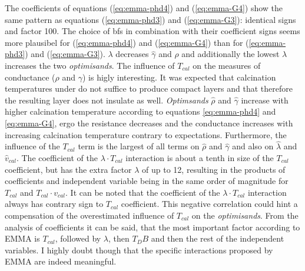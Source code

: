 The coefficients of equations (\ref{eq:emma-phd4}) and (\ref{eq:emma-G4}) show the same pattern 
as equations (\ref{eq:emma-phd3}) and (\ref{eq:emma-G3}): identical signs and factor 100. 
The choice of \gls{bf}s in combination with their coefficient signs seems more plausibel
for (\ref{eq:emma-phd4}) and (\ref{eq:emma-G4}) than for (\ref{eq:emma-phd3}) and (\ref{eq:emma-G3}). 
$\lambda$ decreases $\hat{\gamma}$ and $\hat{\rho}$ and additionally the lowest $\lambda$ increases the two \textit{optimisands}. 
The influence of $T_{cal}$ on the measures of conductance ($\rho$ and $\gamma$) is higly interesting. 
It was expected that 
calcination temperatures under  do not suffice to produce compact layers and 
that therefore the resulting layer does not insulate as well. 
\textit{Optimsands} $\hat\rho$ and $\hat{\gamma}$ increase with higher calcination temperature 
according to equations \ref{eq:emma-phd4} and \ref{eq:emma-G4}, 
ergo the resistance decreases and the conductance increases with increasing calcination temperature contrary to expectations.
Furthermore, the influence of the $T_{cal}$ term is the largest of all terms on $\hat{\rho}$ and $\hat{\gamma}$ and also on $\hat\lambda$ and $\hat{v}_{cal}$.
The coefficient of the $\lambda\cdot T_{cal}$ interaction is about a tenth in size of the $T_{cal}$ coefficient, 
but has the extra factor $\lambda$ of up to 12, resulting in the products of coefficients and independent variable being in the same order of magnitude for $T_{cal}$ and $T_{cal}\cdot v_{cal}$.
It can be noted that the coefficient of the $\lambda\cdot T_{cal}$ interaction always has contrary sign to $T_{cal}$ coefficient. 
This negative correlation could hint a compensation of the overestimated influence of $T_{cal}$ on the \textit{optimisands}.
%
From the analysis of coefficients it can be said, that the most important factor according to EMMA is $T_{cal}$, followed by $\lambda$, then $T_DB$ and then the rest of the independent variables. 
I highly doubt though that the specific interactions proposed by EMMA are indeed meaningful. 


